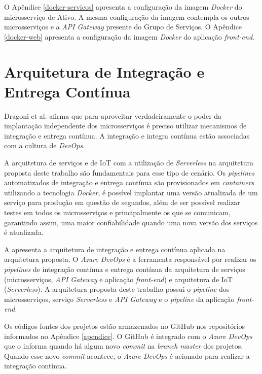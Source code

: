 O Apêndice \ref{docker-servicos} apresenta a configuração da imagem \textit{Docker} do microsserviço de Ativo. A mesma configuração da imagem contempla os outros microsserviços e a \textit{API Gateway} presente do Grupo de Serviços. O Apêndice \ref{docker-web} apresenta a configuração da imagem \textit{Docker} do aplicação \textit{front-end}.

\section{Arquitetura de Integração e Entrega Contínua}

Dragoni et al. \cite{Dragoni2016} afirma que para aproveitar verdadeiramente o poder da implantação independente dos microsserviços é preciso utilizar mecanismos de integração e entrega contínua. A integração e integra contínua estão associadas com a cultura de \textit{DevOps}.

A arquitetura de serviços e de \acrshort{IoT} com a utilização de \textit{Serverless} na arquitetura proposta deste trabalho são fundamentais para esse tipo de cenário. Os \textit{pipelines} automatizados de integração e entrega contínua são provisionados em \textit{containers} utilizando a tecnologia \textit{Docker}, é possível implantar uma versão atualizada de um serviço para produção em questão de segundos, além de ser possível realizar testes em todos os microsserviços e principalmente os que se comunicam, garantindo assim, uma maior confiabilidade quando uma nova versão dos serviços é atualizada.

A  apresenta a arquitetura de integração e entrega contínua aplicada na arquitetura proposta. O \textit{Azure DevOps} é a ferramenta responsável por realizar os \textit{pipelines} de integração contínua e entrega contínua da arquitetura de serviços (microsserviços, \textit{API Gateway} e aplicação \textit{front-end}) e arquitetura de \acrlong{IoT} (\textit{Serverless}). A arquitetura proposta deste trabalho possui o \textit{pipeline} dos microsserviços, serviço \textit{Serverless} e \textit{API Gateway} e o \textit{pipeline} da aplicação \textit{front-end}.


Os códigos fontes dos projetos estão armazenados no GitHub nos repositórios informados no Apêndice \ref{apendice}. O GitHub é integrado com o \textit{Azure DevOps} que o informa quando há algum novo \textit{commit} na \textit{branch} \textit{master} dos projetos. Quando esse novo \textit{commit} acontece, o \textit{Azure DevOps} é acionado para realizar a integração contínua.

